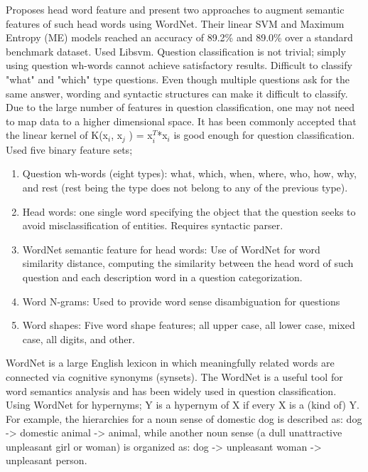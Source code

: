 Proposes head word feature and present two approaches to augment semantic features of such head words using WordNet. 
Their linear SVM and Maximum Entropy (ME) models reached an accuracy of 89.2\% and 89.0\% over a standard benchmark dataset. 
Used Libsvm.
Question classification is not trivial; simply using question wh-words cannot achieve satisfactory results. 
Difficult to classify "what" and "which" type questions. 
Even though multiple questions ask for the same answer, wording and syntactic structures can make it difficult to classify.
Due to the large number of features in question classification, one may not need to map data to a higher dimensional space. 
It has been commonly accepted that the linear kernel of
	K(x$_{i}$, x$_{j}$ ) = x$_{i}^{T}$*x$_{i}$
is good enough for question classification. \\
Used five binary feature sets; 
\begin{enumerate}
	\item Question wh-words (eight types): what, which, when, where, who, how, why, and rest (rest being the type does not belong to any of the previous type).
	\item Head words: one single word specifying the object that the question seeks to avoid misclassification of entities. Requires syntactic parser.
	\item WordNet semantic feature for head words: 
	Use of WordNet for word similarity distance, computing the similarity between the head word of such question and each description word in a question categorization.
	\item Word N-grams: Used to provide word sense disambiguation for questions
	\item Word shapes: Five word shape features; all upper case, all lower case, mixed case, all digits, and other.
\end{enumerate}
WordNet is a large English lexicon in which meaningfully related words are connected via cognitive synonyms (synsets).  
The WordNet is a useful tool for word semantics analysis and has been widely used in question classification. 
Using WordNet for hypernyms; Y is a hypernym of X if every X is a (kind of) Y.
For example, the hierarchies for a noun sense of domestic dog is described as: 
	dog -> domestic animal -> animal, 
while another noun sense (a dull unattractive unpleasant girl or woman)  is organized as:
	dog -> unpleasant woman -> unpleasant person.
